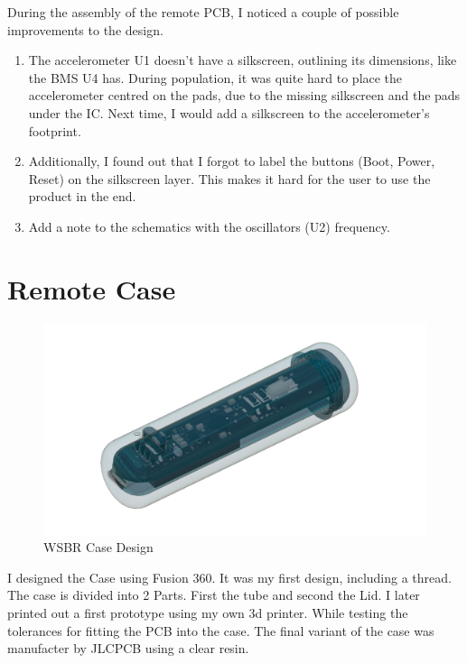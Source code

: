  During the assembly of the remote PCB, I noticed a couple of possible improvements to the design.
 \begin{enumerate}
     \item The accelerometer U1 doesn't have a silkscreen, outlining its dimensions, like the BMS U4 has. During population, it was quite hard to place the accelerometer centred on the pads, due to the missing silkscreen and the pads under the IC. Next time, I would add a silkscreen to the accelerometer's footprint. 
     \item Additionally, I found out that I forgot to label the buttons (Boot, Power, Reset) on the silkscreen layer. This makes it hard for the user to use the product in the end.
     \item Add a note to the schematics with the oscillators (U2) frequency.
 \end{enumerate}

 \section{Remote Case}

 \begin{figure}[H]
	\centering
	\includegraphics[width=16cm]{2_Documentation/Documentation_Wireless_ScoreBoard_Remote/Resources/WSBR_Case v8.png}
	\caption{WSBR Case Design}
	\label{fig:WSBR Case Design}
\end{figure}

\vspace{5mm}

I designed the Case using Fusion 360. It was my first design, including a thread. The case is divided into 2 Parts. First the tube and second the Lid. I later printed out a first prototype using my own 3d printer. While testing the tolerances for fitting the PCB into the case. The final variant of the case was manufacter by JLCPCB using a clear resin.